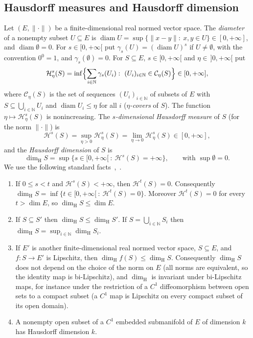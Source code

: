 \documentclass[11pt,a4paper]{article}
\theoremstyle{definition}
\theoremstyle{remark}
\numberwithin{equation}{section}
\newcommand{\N}{\mathbb{N}}
\newcommand{\dimH}{\dim_{\mathrm{H}}}
\newcommand{\norm}[1]{\lVert #1\rVert}
\begin{document}
\subsection{Hausdorff measures and Hausdorff dimension}\label{sec:hausdorff}
Let $(E,\norm\cdot)$ be a finite-dimensional real normed vector space. The \emph{diameter} of a nonempty subset $U\subseteq E$ is $\operatorname{diam}U=\sup\{\norm{x-y}:\ x,y\in U\}\in[0,+\infty]$, and $\operatorname{diam}\emptyset=0$. For $s\in[0,+\infty[$ put $\gamma_s(U)=(\operatorname{diam}U)^s$ if $U\neq\emptyset$, with the convention $0^0=1$, and $\gamma_s(\emptyset)=0$. For $S\subseteq E$, $s\in[0,+\infty[$ and $\eta\in\,]0,+\infty[$ put
\[
\mathcal H^s_\eta(S)=\inf\Bigl\{\sum_{i\in\N}\gamma_s(U_i):\ (U_i)_{i\in\N}\in\mathcal C_\eta(S)\Bigr\}\in[0,+\infty],
\]
where $\mathcal C_\eta(S)$ is the set of sequences $(U_i)_{i\in\N}$ of subsets of $E$ with $S\subseteq\bigcup_{i\in\N}U_i$ and $\operatorname{diam}U_i\le\eta$ for all $i$ (\emph{$\eta$-covers} of $S$).
The function $\eta\mapsto\mathcal H^s_\eta(S)$ is nonincreasing. The \emph{$s$-dimensional Hausdorff measure} of $S$ (for the norm $\norm\cdot$) is
\[
\mathcal H^s(S)=\sup_{\eta>0}\mathcal H^s_\eta(S)=\lim_{\eta\to0}\mathcal H^s_\eta(S)\in[0,+\infty],
\]
and the \emph{Hausdorff dimension} of $S$ is
\[
\dimH S=\sup\bigl\{s\in[0,+\infty[\ :\ \mathcal H^s(S)=+\infty\bigr\},\qquad\text{with }\sup\emptyset=0.
\]
We use the following standard facts~\cite[Chapter~4]{mattila},~\cite{falconer}.
\begin{enumerate}[label=(H\arabic*),leftmargin=3em,start=0]
\item\label{H:def} If $0\le s<t$ and $\mathcal H^s(S)<+\infty$, then $\mathcal H^t(S)=0$. Consequently $\dimH S=\inf\{t\in[0,+\infty[\ :\ \mathcal H^t(S)=0\}$. Moreover $\mathcal H^t(S)=0$ for every $t>\dim E$, so $\dimH S\le\dim E$.
\item\label{H:mono} If $S\subseteq S'$ then $\dimH S\le\dimH S'$. If $S=\bigcup_{i\in\N}S_i$ then $\dimH S=\sup_{i\in\N}\dimH S_i$.
\item\label{H:lip} If $E'$ is another finite-dimensional real normed vector space, $S\subseteq E$, and $f:S\to E'$ is Lipschitz, then $\dimH f(S)\le\dimH S$. Consequently $\dimH S$ does not depend on the choice of the norm on $E$ (all norms are equivalent, so the identity map is bi-Lipschitz), and $\dimH$ is invariant under bi-Lipschitz maps, for instance under the restriction of a $C^1$ diffeomorphism between open sets to a compact subset (a $C^1$ map is Lipschitz on every compact subset of its open domain).
\item\label{H:mfd} A nonempty open subset of a $C^1$ embedded submanifold of $E$ of dimension $k$ has Hausdorff dimension $k$.
\end{enumerate}
\end{document}

